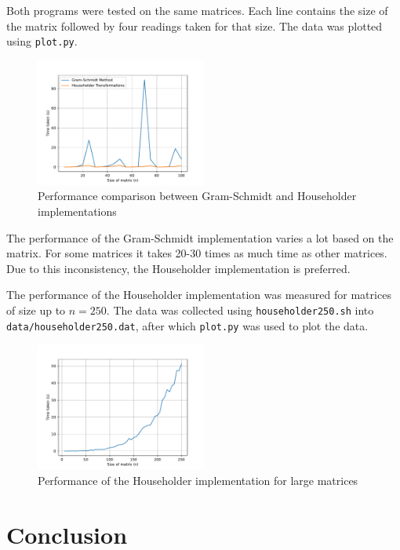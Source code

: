 \documentclass{article}
\begin{document}
Both programs were tested on the same matrices. Each line contains the size of the matrix
followed by four readings taken for that size. The data was plotted using \texttt{plot.py}.

\begin{figure}[h!]
    \centering
    \includegraphics[width=0.5\textwidth]{../figs/compare}
    \caption{Performance comparison between Gram-Schmidt and Householder implementations}
\end{figure}

The performance of the Gram-Schmidt implementation varies a lot based on the matrix.
For some matrices it takes 20-30 times as much time as other matrices. Due to this
inconsistency, the Householder implementation is preferred.

The performance of the Householder implementation was measured for matrices of size
up to $n = 250$. The data was collected using \texttt{householder250.sh} into
\texttt{data/householder250.dat}, after which \texttt{plot.py} was used to plot the data.

\begin{figure}[h!]
    \centering
    \includegraphics[width=0.5\textwidth]{../figs/householder250.pdf}
    \caption{Performance of the Householder implementation for large matrices}
\end{figure}

\section{Conclusion}
\end{document}
